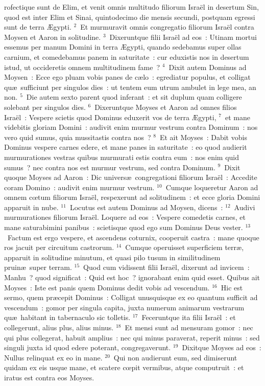 \bchapter
{}rofectique sunt de Elim, et venit omnis multitudo filiorum Isra\"el in desertum Sin, quod est inter Elim et Sinai, quintodecimo die mensis secundi, postquam egressi sunt de terra \AE gypti.
${}^{2}$~Et murmuravit omnis congregatio filiorum Isra\"el contra Moysen et Aaron in solitudine.
${}^{3}$~Dixeruntque filii Isra\"el ad eos~: Utinam mortui essemus per manum Domini in terra \AE gypti, quando sedebamus super ollas carnium, et comedebamus panem in saturitate~: cur eduxistis nos in desertum istud, ut occideretis omnem multitudinem fame~?
${}^{4}$~Dixit autem Dominus ad Moysen~: Ecce ego pluam vobis panes de c\ae lo~: egrediatur populus, et colligat qu\ae\ sufficiunt per singulos dies~: ut tentem eum utrum ambulet in lege mea, an non.
${}^{5}$~Die autem sexto parent quod inferant~: et sit duplum quam colligere solebant per singulos dies.
${}^{6}$~Dixeruntque Moyses et Aaron ad omnes filios Isra\"el~: Vespere scietis quod Dominus eduxerit vos de terra \AE gypti,
${}^{7}$~et mane videbitis gloriam Domini~: audivit enim murmur vestrum contra Dominum~: nos vero quid sumus, quia mussitastis contra nos~?
${}^{8}$~Et ait Moyses~: Dabit vobis Dominus vespere carnes edere, et mane panes in saturitate~: eo quod audierit murmurationes vestras quibus murmurati estis contra eum~: nos enim quid sumus~? nec contra nos est murmur vestrum, sed contra Dominum.
${}^{9}$~Dixit quoque Moyses ad Aaron~: Dic univers\ae\ congregationi filiorum Isra\"el~: Accedite coram Domino~: audivit enim murmur vestrum.
${}^{10}$~Cumque loqueretur Aaron ad omnem cœtum filiorum Isra\"el, respexerunt ad solitudinem~: et ecce gloria Domini apparuit in nube.
${}^{11}$~Locutus est autem Dominus ad Moysen, dicens~:
${}^{12}$~Audivi murmurationes filiorum Isra\"el. Loquere ad eos~: Vespere comedetis carnes, et mane saturabimini panibus~: scietisque quod ego sum Dominus Deus vester.
${}^{13}$~Factum est ergo vespere, et ascendens coturnix, cooperuit castra~: mane quoque ros jacuit per circuitum castrorum.
${}^{14}$~Cumque operuisset superficiem terr\ae , apparuit in solitudine minutum, et quasi pilo tusum in similitudinem pruin\ae\ super terram.
${}^{15}$~Quod cum vidissent filii Isra\"el, dixerunt ad invicem~: Manhu~? quod significat~: Quid est hoc~? ignorabant enim quid esset. Quibus ait Moyses~: Iste est panis quem Dominus dedit vobis ad vescendum.
${}^{16}$~Hic est sermo, quem pr\ae cepit Dominus~: Colligat unusquisque ex eo quantum sufficit ad vescendum~: gomor per singula capita, juxta numerum animarum vestrarum qu\ae\ habitant in tabernaculo sic tolletis.
${}^{17}$~Feceruntque ita filii Isra\"el~: et collegerunt, alius plus, alius minus.
${}^{18}$~Et mensi sunt ad mensuram gomor~: nec qui plus collegerat, habuit amplius~: nec qui minus paraverat, reperit minus~: sed singuli juxta id quod edere poterant, congregaverunt.
${}^{19}$~Dixitque Moyses ad eos~: Nullus relinquat ex eo in mane.
${}^{20}$~Qui non audierunt eum, sed dimiserunt quidam ex eis usque mane, et scatere cœpit vermibus, atque computruit~: et iratus est contra eos Moyses.


